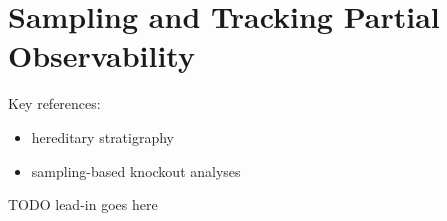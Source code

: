 \section{Sampling and Tracking Partial Observability}
\label{sec:best-effort}

Key references:
\begin{itemize}
\item hereditary stratigraphy \citep{moreno2022hereditary,moreno2024guide}
\item sampling-based knockout analyses \citep{moreno2024methods}
\end{itemize}

TODO lead-in goes here





